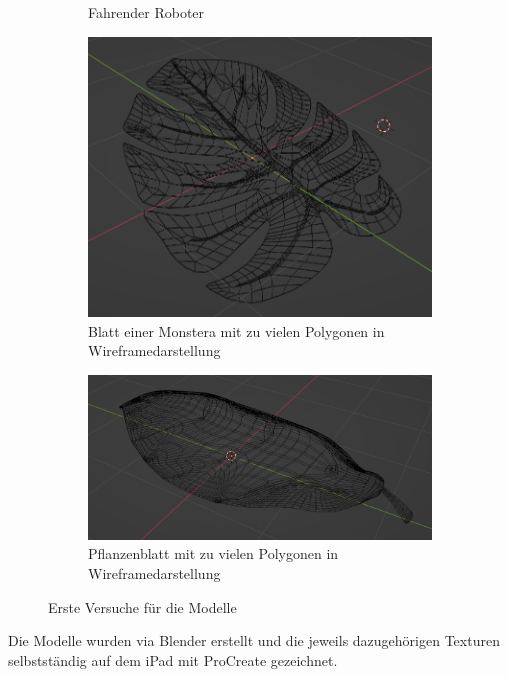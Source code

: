 \begin{figure}[H]
\begin{subfigure}{0.5\textwidth}
		\caption{Fahrender Roboter}
	\end{subfigure}
	\begin{subfigure}{0.5\textwidth}
		\centering
		\includegraphics[height=0.3\pageheight,keepaspectratio]{pics/8}
		\caption{Blatt einer Monstera mit zu vielen Polygonen in Wireframedarstellung}
	\end{subfigure}
	\begin{subfigure}{0.5\textwidth}
		\centering
		\includegraphics[height=0.3\pageheight,keepaspectratio]{pics/9}
		\caption{Pflanzenblatt mit zu vielen Polygonen in Wireframedarstellung}
	\end{subfigure}
	\caption{Erste Versuche für die Modelle}
\end{figure}
\par
Die Modelle wurden via Blender erstellt und die jeweils dazugehörigen Texturen selbstständig auf dem iPad mit ProCreate gezeichnet.
\par
